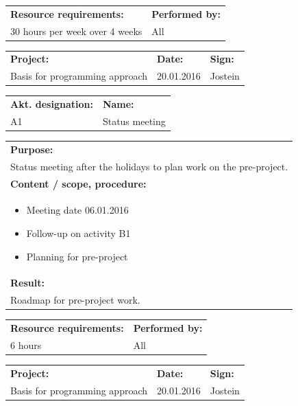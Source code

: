 \documentclass[12pt, a4paper]{article}
\begin{document}
\begin{tabularx}{\textwidth}{|X|p{30mm}|}
	\textbf{Resource requirements:}&\textbf{Performed by:}\\
	30 hours per week over 4 weeks&All\\
	\hline
\end{tabularx}

\newpage

\begin{tabularx}{\textwidth}{|X|p{32mm}|p{20mm}|}
	\hline
	\textbf{Project:}&\textbf{Date:}&\textbf{Sign:}\\
	Basis for programming approach&20.01.2016&Jostein\\
	\hline
\end{tabularx}

\begin{tabularx}{\textwidth}{|p{40mm}|X|}
	\textbf{Akt. designation:}&\textbf{Name:}\\
	A1&Status meeting\\
	\hline
\end{tabularx}

\begin{tabularx}{\textwidth}{|X|}
	\textbf{Purpose:}\\
	Status meeting after the holidays to plan work on the pre-project.\\
	\hline
	\textbf{Content / scope, procedure:}\\
	\begin{itemize}[noitemsep,topsep=0pt]
		\item Meeting date 06.01.2016
		\item Follow-up on activity B1
		\item Planning for pre-project 
	\end{itemize}\\
 	\hline
	\textbf{Result:}\\
	Roadmap for pre-project work.\\
	\hline
\end{tabularx}

\begin{tabularx}{\textwidth}{|X|p{30mm}|}
	\textbf{Resource requirements:}&\textbf{Performed by:}\\
	6 hours&All\\
	\hline
\end{tabularx}

\newpage

\begin{tabularx}{\textwidth}{|X|p{32mm}|p{20mm}|}
	\hline
	\textbf{Project:}&\textbf{Date:}&\textbf{Sign:}\\
	Basis for programming approach&20.01.2016&Jostein\\
	\hline
\end{tabularx}
\end{document}
